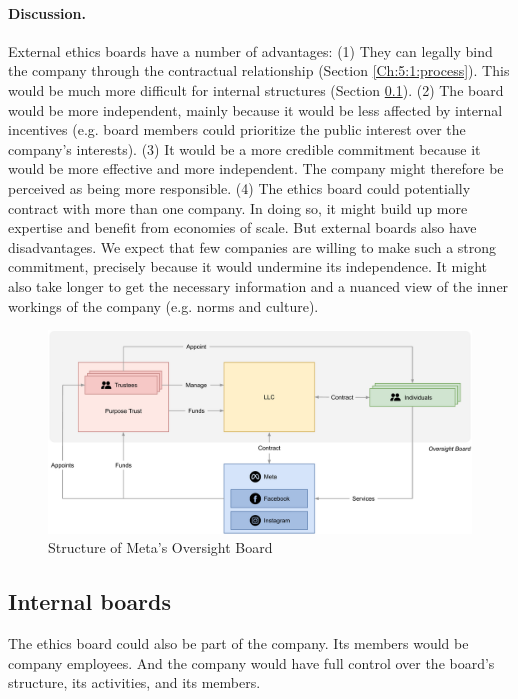 \documentclass{article}
\begin{document}
\paragraph{Discussion.} External ethics boards have a number of advantages: (1) They can legally bind the company through the contractual relationship (Section \ref{Ch:5:1:process}). This would be much more difficult for internal structures (Section \ref{Ch:3:2:internal}). (2) The board would be more independent, mainly because it would be less affected by internal incentives (e.g. board members could prioritize the public interest over the company’s interests). (3) It would be a more credible commitment because it would be more effective and more independent. The company might therefore be perceived as being more responsible. (4) The ethics board could potentially contract with more than one company. In doing so, it might build up more expertise and benefit from economies of scale. But external boards also have disadvantages. We expect that few companies are willing to make such a strong commitment, precisely because it would undermine its independence. It might also take longer to get the necessary information and a nuanced view of the inner workings of the company (e.g. norms and culture).

\begin{figure}
    \includegraphics[width=\textwidth]{oversightboard_structure.pdf}
    \caption{Structure of Meta’s Oversight Board}
    \label{fig2}
\end{figure}

\subsection{Internal boards}\label{Ch:3:2:internal}

The ethics board could also be part of the company. Its members would be company employees. And the company would have full control over the board’s structure, its activities, and its members.
\end{document}
